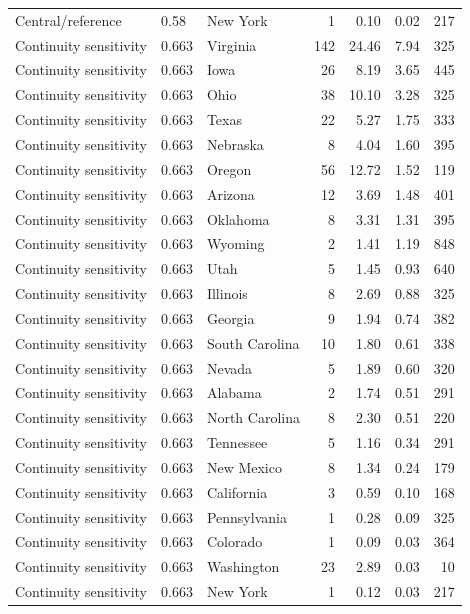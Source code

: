 \documentclass[12pt]{article}
\begin{document}
\begin{landscape}
\begin{longtable}{ll l r r r r}
Central/reference & 0.58 & New York & 1 & 0.10 & 0.02 & 217 \\
Continuity sensitivity & 0.663 & Virginia & 142 & 24.46 & 7.94 & 325 \\
Continuity sensitivity & 0.663 & Iowa & 26 & 8.19 & 3.65 & 445 \\
Continuity sensitivity & 0.663 & Ohio & 38 & 10.10 & 3.28 & 325 \\
Continuity sensitivity & 0.663 & Texas & 22 & 5.27 & 1.75 & 333 \\
Continuity sensitivity & 0.663 & Nebraska & 8 & 4.04 & 1.60 & 395 \\
Continuity sensitivity & 0.663 & Oregon & 56 & 12.72 & 1.52 & 119 \\
Continuity sensitivity & 0.663 & Arizona & 12 & 3.69 & 1.48 & 401 \\
Continuity sensitivity & 0.663 & Oklahoma & 8 & 3.31 & 1.31 & 395 \\
Continuity sensitivity & 0.663 & Wyoming & 2 & 1.41 & 1.19 & 848 \\
Continuity sensitivity & 0.663 & Utah & 5 & 1.45 & 0.93 & 640 \\
Continuity sensitivity & 0.663 & Illinois & 8 & 2.69 & 0.88 & 325 \\
Continuity sensitivity & 0.663 & Georgia & 9 & 1.94 & 0.74 & 382 \\
Continuity sensitivity & 0.663 & South Carolina & 10 & 1.80 & 0.61 & 338 \\
Continuity sensitivity & 0.663 & Nevada & 5 & 1.89 & 0.60 & 320 \\
Continuity sensitivity & 0.663 & Alabama & 2 & 1.74 & 0.51 & 291 \\
Continuity sensitivity & 0.663 & North Carolina & 8 & 2.30 & 0.51 & 220 \\
Continuity sensitivity & 0.663 & Tennessee & 5 & 1.16 & 0.34 & 291 \\
Continuity sensitivity & 0.663 & New Mexico & 8 & 1.34 & 0.24 & 179 \\
Continuity sensitivity & 0.663 & California & 3 & 0.59 & 0.10 & 168 \\
Continuity sensitivity & 0.663 & Pennsylvania & 1 & 0.28 & 0.09 & 325 \\
Continuity sensitivity & 0.663 & Colorado & 1 & 0.09 & 0.03 & 364 \\
Continuity sensitivity & 0.663 & Washington & 23 & 2.89 & 0.03 & 10 \\
Continuity sensitivity & 0.663 & New York & 1 & 0.12 & 0.03 & 217 \\

\end{longtable}
\end{landscape}
\end{document}
